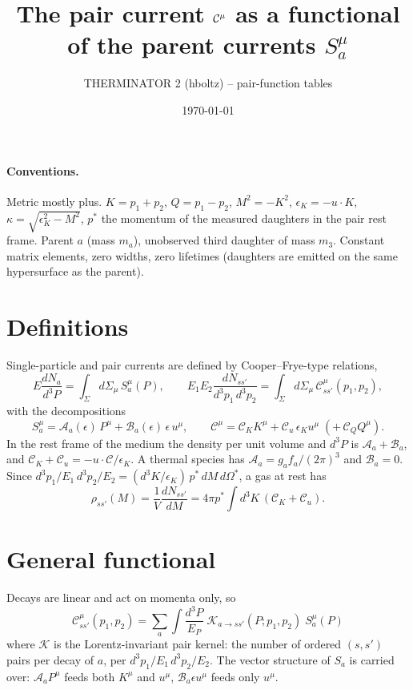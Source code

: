 \documentclass[11pt]{article}
\title{The pair current $\C^\mu$ as a functional of the parent currents $S_a^\mu$}
\author{THERMINATOR 2 (hboltz) -- pair-function tables}
\date{\today}
\newcommand{\A}{\mathcal A}
\newcommand{\B}{\mathcal B}
\newcommand{\C}{\mathcal C}
\newcommand{\K}{\mathcal K}
\begin{document}
\maketitle

\paragraph{Conventions.} Metric mostly plus. $K=p_1+p_2$, $Q=p_1-p_2$, $M^2=-K^2$,
$\epsilon_K=-u\cdot K$, $\kappa=\sqrt{\epsilon_K^2-M^2}$, $p^*$ the momentum of the measured daughters in
the pair rest frame. Parent $a$ (mass $m_a$), unobserved third daughter of mass $m_3$. Constant matrix
elements, zero widths, zero lifetimes (daughters are emitted on the same hypersurface as the parent).

\section{Definitions}

Single-particle and pair currents are defined by Cooper--Frye-type relations,
\begin{equation}
E\frac{dN_a}{d^3P}=\int_\Sigma d\Sigma_\mu\,S_a^\mu(P),\qquad
E_1E_2\frac{dN_{ss'}}{d^3p_1\,d^3p_2}=\int_\Sigma d\Sigma_\mu\,\C^\mu_{ss'}(p_1,p_2),
\end{equation}
with the decompositions
\begin{equation}
S_a^\mu=\A_a(\epsilon)\,P^\mu+\B_a(\epsilon)\,\epsilon\,u^\mu,\qquad
\C^\mu=\C_K K^\mu+\C_u\,\epsilon_K u^\mu\;(+\,\C_Q Q^\mu).
\end{equation}
In the rest frame of the medium the density per unit volume and $d^3P$ is $\A_a+\B_a$, and
$\C_K+\C_u=-u\cdot\C/\epsilon_K$. A thermal species has $\A_a=g_af_a/(2\pi)^3$ and $\B_a=0$.
Since $d^3p_1/E_1\,d^3p_2/E_2=(d^3K/\epsilon_K)\,p^*\,dM\,d\Omega^*$, a gas at rest has
\begin{equation}
\rho_{ss'}(M)=\frac{1}{V}\frac{dN_{ss'}}{dM}=4\pi p^*\!\int d^3K\,(\C_K+\C_u).
\end{equation}

\section{General functional}

Decays are linear and act on momenta only, so
\begin{equation}
\boxed{\;\C^\mu_{ss'}(p_1,p_2)=\sum_a\int\frac{d^3P}{E_P}\;\K_{a\to ss'}(P;p_1,p_2)\;S_a^\mu(P)\;}
\label{eq:master}
\end{equation}
where $\K$ is the Lorentz-invariant pair kernel: the number of ordered $(s,s')$ pairs per decay of $a$,
per $d^3p_1/E_1\,d^3p_2/E_2$. The vector structure of $S_a$ is carried over: $\A_a P^\mu$ feeds both
$K^\mu$ and $u^\mu$, $\B_a\epsilon u^\mu$ feeds only $u^\mu$.
\end{document}
